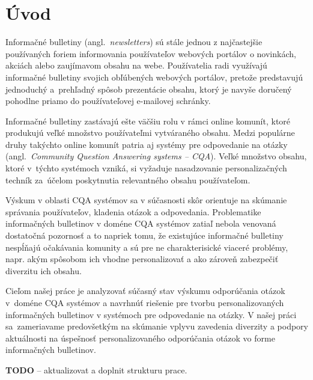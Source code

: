 \newpage
\chapter{Úvod}

Informačné bulletiny (angl.~\emph{newsletters}) sú stále jednou z najčastejšie používaných foriem informovania používateľov
webových portálov o novinkách, akciách alebo zaujímavom obsahu na webe. Používatelia radi využívajú informačné bulletiny
svojich obľúbených webových portálov, pretože predstavujú jednoduchý a~prehľadný spôsob prezentácie obsahu, ktorý je navyše
doručený pohodlne priamo do používateľovej e-mailovej schránky.

Informačné bulletiny zastávajú ešte väčšiu rolu v rámci online komunít, ktoré produkujú veľké množstvo používateľmi
vytváraného obsahu. Medzi populárne druhy takýchto online komunít patria aj systémy pre odpovedanie na otázky
(angl.~\emph{Community Question Answering systems -- CQA}). Veľké množstvo obsahu, ktoré v~týchto systémoch vzniká,
si vyžaduje nasadzovanie personalizačných techník za~účelom poskytnutia relevantného obsahu používateľom.

Výskum v oblasti CQA systémov sa v súčasnosti skôr orientuje na skúmanie správania používateľov, kladenia otázok a odpovedania.
Problematike informačných bulletinov v doméne CQA systémov zatiaľ nebola venovaná dostatočná pozornosť a to napriek tomu,
že existujúce informačné bulletiny nespĺňajú očakávania komunity a sú pre ne charakterisické viaceré problémy, napr.
akým spôsobom ich vhodne personalizovať a ako zároveň zabezpečiť diverzitu ich obsahu.

Cieľom našej práce je analyzovať súčasný stav výskumu odporúčania otázok v~doméne CQA systémov a navrhnúť riešenie pre
tvorbu personalizovaných informačných bulletinov v systémoch pre odpovedanie na otázky. V našej práci sa~zameriavame
predovšetkým na skúmanie vplyvu zavedenia diverzity a podpory aktuálnosti na úspešnosť personalizovaného odporúčania
otázok vo forme informačných bulletinov.

\textbf{TODO} -- aktualizovat a doplnit strukturu prace.
